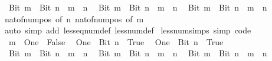 \begin{isabellebody}
\ \ {\isachardoublequoteopen}Bit{}\ m\ {\isasymle}\ Bit{}\ n\ {\isasymlongleftrightarrow}\ m\ {\isasymle}\ n{\isachardoublequoteclose}\isanewline
\ \ {\isachardoublequoteopen}Bit{}\ m\ {\isasymle}\ Bit{}\ n\ {\isasymlongleftrightarrow}\ m\ {\isasymle}\ n{\isachardoublequoteclose}\isanewline
\ \ {\isachardoublequoteopen}Bit{}\ m\ {\isasymle}\ Bit{}\ n\ {\isasymlongleftrightarrow}\ m\ {\isacharless}{\kern0pt}\ n{\isachardoublequoteclose}\isanewline
%
\isadelimproof
\ \ %
\endisadelimproof
%
\isatagproof
{}\isamarkupfalse%
\ nat{\isacharunderscore}{\kern0pt}of{\isacharunderscore}{\kern0pt}num{\isacharunderscore}{\kern0pt}pos\ {\isacharbrackleft}{\kern0pt}of\ n{\isacharbrackright}{\kern0pt}\ nat{\isacharunderscore}{\kern0pt}of{\isacharunderscore}{\kern0pt}num{\isacharunderscore}{\kern0pt}pos\ {\isacharbrackleft}{\kern0pt}of\ m{\isacharbrackright}{\kern0pt}\isanewline
\ \ \isamarkupfalse%
\ {\isacharparenleft}{\kern0pt}auto\ simp\ add{\isacharcolon}{\kern0pt}\ less{\isacharunderscore}{\kern0pt}eq{\isacharunderscore}{\kern0pt}num{\isacharunderscore}{\kern0pt}def\ less{\isacharunderscore}{\kern0pt}num{\isacharunderscore}{\kern0pt}def{\isacharparenright}{\kern0pt}%
\endisatagproof
{\isafoldproof}%
%
\isadelimproof
\isanewline
%
\endisadelimproof
\isanewline
{}\isamarkupfalse%
\ less{\isacharunderscore}{\kern0pt}num{\isacharunderscore}{\kern0pt}simps\ {\isacharbrackleft}{\kern0pt}simp{\isacharcomma}{\kern0pt}\ code{\isacharbrackright}{\kern0pt}{\isacharcolon}{\kern0pt}\isanewline
\ \ {\isachardoublequoteopen}m\ {\isacharless}{\kern0pt}\ One\ {\isasymlongleftrightarrow}\ False{\isachardoublequoteclose}\isanewline
\ \ {\isachardoublequoteopen}One\ {\isacharless}{\kern0pt}\ Bit{}\ n\ {\isasymlongleftrightarrow}\ True{\isachardoublequoteclose}\isanewline
\ \ {\isachardoublequoteopen}One\ {\isacharless}{\kern0pt}\ Bit{}\ n\ {\isasymlongleftrightarrow}\ True{\isachardoublequoteclose}\isanewline
\ \ {\isachardoublequoteopen}Bit{}\ m\ {\isacharless}{\kern0pt}\ Bit{}\ n\ {\isasymlongleftrightarrow}\ m\ {\isacharless}{\kern0pt}\ n{\isachardoublequoteclose}\isanewline
\ \ {\isachardoublequoteopen}Bit{}\ m\ {\isacharless}{\kern0pt}\ Bit{}\ n\ {\isasymlongleftrightarrow}\ m\ {\isasymle}\ n{\isachardoublequoteclose}\isanewline
\ \ {\isachardoublequoteopen}Bit{}\ m\ {\isacharless}{\kern0pt}\ Bit{}\ n\ {\isasymlongleftrightarrow}\ m\ {\isacharless}{\kern0pt}\ n{\isachardoublequoteclose}\isanewline

\end{isabellebody}
